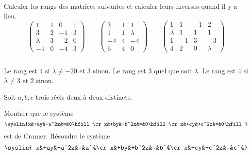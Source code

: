 \documentclass{magnolia}
\begin{document}
Calculer les rangs des matrices suivantes et calculer leurs inverses quand il y
a lieu.
\[\begin{pmatrix}
   1 & 1 & 0 & 1\\
   3 & 2 & -1 & 3\\
   \lambda & 3 & -2 & 0\\
   -1 & 0 & -4 & 3
  \end{pmatrix}\qquad
  \begin{pmatrix}
  3 & 1 & 1\\
  1 & 1 & \lambda\\
  -4 & 4 & -4\\
  6 & 4 & 0
  \end{pmatrix}\qquad
  \begin{pmatrix}
  1 & 1 & -1 & 2\\
  \lambda & 1 & 1 & 1\\
  1 & -1 & 3 & -3\\
  4 & 2 & 0 & \lambda
  \end{pmatrix}\]
\begin{sol}
$\quad$
\begin{questions}
\question Le rang est 4 si $\lambda\neq -20$ et 3 sinon.
\question Le rang est 3 quel que soit $\lambda$.
\question Le rang est 4 si $\lambda\neq 3$ et 2 sinon.
\end{questions}
\end{sol}



Soit $a,b,c$ trois réels deux à deux distincts.
\begin{questions}
\question Montrer que le système
  \[\syslin{x&+ay&+a^2z&=&0\hfill\cr
            x&+by&+b^2z&=&0\hfill\cr
            x&+cy&+c^2z&=&0\hfill}\]
  est de Cramer.
\question Résoudre le système
  \[\syslin{
  x&+ay&+a^2z&=&a^4\cr
  x&+by&+b^2z&=&b^4\cr
  x&+cy&+c^2z&=&c^4}\]
\end{questions}
\end{document}
